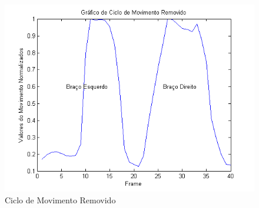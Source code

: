 \begin{figure}[!htb]
     \centering
     \includegraphics[width=1\textwidth]{./img/ciclomovimentoremovido.png}
     \caption{Ciclo de Movimento Removido}
		 \label{img:ciclo_filtrado}
\end{figure}














